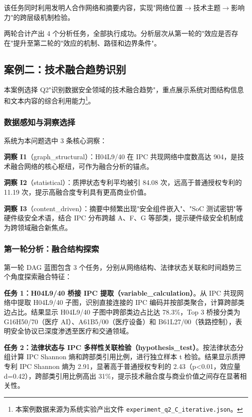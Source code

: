 该任务同时利用发明人合作网络和摘要内容，实现"网络位置$\rightarrow$技术主题$\rightarrow$影响力"的跨层级机制检验。

两轮合计产出 4 个分析任务，全部执行成功。分析层次从第一轮的"效应是否存在"提升至第二轮的"效应的机制、路径和边界条件"。

\subsection{案例二：技术融合趋势识别}

本案例选择 Q2"识别数据安全领域的技术融合趋势"，重点展示系统对图结构信息和文本内容的综合利用能力\footnote{本案例数据来源为系统实验产出文件 \texttt{experiment\_q2\_C\_iterative.json}。}。

\subsubsection{数据感知与洞察选择}

系统为本问题选中 3 条核心洞察：

\textbf{洞察 I1}（graph\_structural）：H04L9/40 在 IPC 共现网络中度数高达 904，是技术融合网络的核心枢纽，可作为融合分析的锚点。

\textbf{洞察 I2}（statistical）：质押状态专利平均被引 84.08 次，远高于普通授权专利的 11.19 次，提示高融合度专利具有更高商业价值。

\textbf{洞察 I3}（content\_driven）：摘要中频繁出现"安全组件嵌入"、"SoC 测试密钥"等硬件级安全术语，结合 IPC 分布跨越 A、F、G 等部类，提示硬件级安全机制成为跨领域融合新焦点。

\subsubsection{第一轮分析：融合结构探索}

第一轮 DAG 蓝图包含 3 个任务，分别从网络结构、法律状态关联和时间趋势三个角度探索融合特征：

\textbf{任务 1：H04L9/40 桥接 IPC 提取（variable\_calculation）}。从 IPC 共现网络中提取 H04L9/40 子图，识别直接连接的 IPC 编码并按部类聚合，计算跨部类边占比。结果显示 H04L9/40 子图中跨部类边占比达 78.3\%，Top 3 桥接分类为 G16H50/70（医疗 AI）、A61B5/00（医疗设备）和 B61L27/00（铁路控制），表明安全协议已深度渗透至医疗和交通领域。

\textbf{任务 2：法律状态与 IPC 多样性关联检验（hypothesis\_test）}。按法律状态分组计算 IPC Shannon 熵和跨部类引用比例，进行独立样本 t 检验。结果显示质押专利 IPC Shannon 熵为 2.91，显著高于普通授权专利的 2.43（p<0.01，效应量 d=0.42），跨部类引用比例高出 31\%，提示技术融合度与商业价值之间存在显著相关性。

